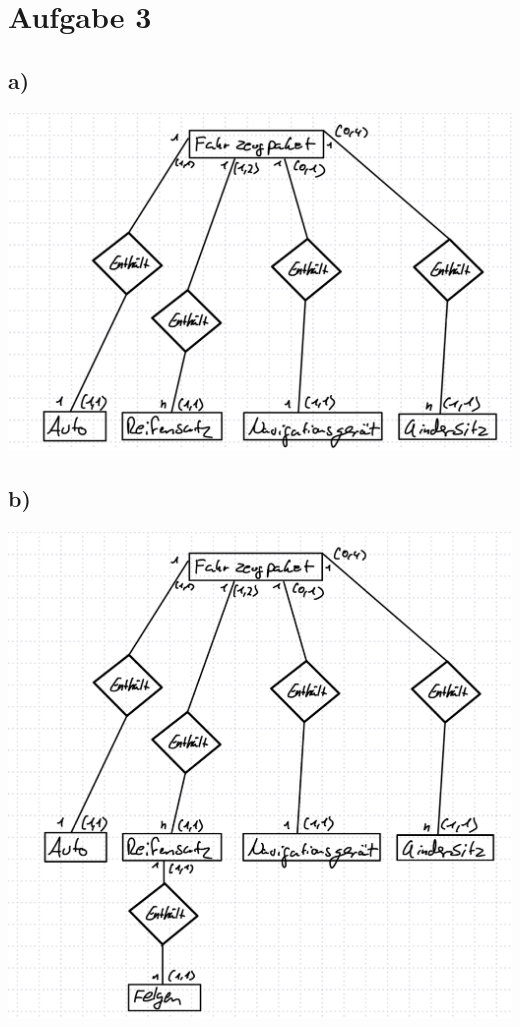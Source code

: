 \section*{Aufgabe 3}
\subsection*{a)}
\includegraphics[width=\linewidth]{./img/aufgabe3a.png}
\subsection*{b)}
\includegraphics[width=\linewidth]{./img/aufgabe3b.png}